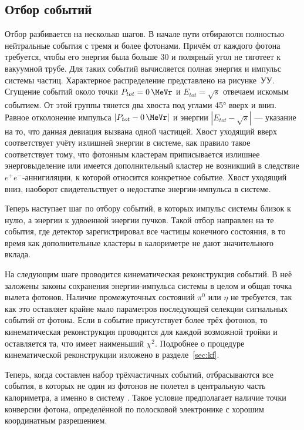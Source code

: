 \subsection{Отбор событий}

Отбор разбивается на несколько шагов. В начале пути отбираются полностью нейтральные события с тремя и более фотонами.
Причём от каждого фотона требуется, чтобы его энергия была больше \SI{30}{\MeVr} и полярный угол не тяготеет к вакуумной трубе.
Для таких событий вычисляется полная энергия и импульс системы частиц.
Характерное распределение представлено на рисунке~УУ.
Сгущение событий около точки $P_{tot} = \SI{0}{\MeVr}$ и $E_{tot} = \sqrt{s}$ отвечаем искомым событием.
От этой группы тянется два хвоста под углами \ang{45} вверх и вниз.
Равное отколонение импульса $|P_{tot} - \SI{0}{\MeVr}|$ и энергии $|E_{tot} - \sqrt{s}|$
---
указание на то,
что данная девиация вызвана одной частицей.
Хвост уходящий вверх соответствует учёту излишней энергии в системе,
как правило такое соответствует тому, что фотонным кластерам приписывается излишнее энерговыделение или имеется дополнительный кластер не возникший в следствие $e^+e^-$-аннигиляции, к которой относится конкретное событие.
Хвост уходящий вниз, наоборот свидетельствует о недостатке энергии-импульса в системе.

Теперь наступает шаг по отбору событий, в которых импульс системы близок к нулю, а энергии к удвоенной энергии пучков.
Такой отбор направлен на те события,
где детектор зарегистрировал все частицы конечного состояния,
в то время как дополнительные кластеры в калориметре не дают значительного вклада.

На следующим шаге проводится кинематическая реконструкция событий.
В неё заложены законы сохранения энергии-импульса системы в целом и общая точка вылета фотонов.
Наличие промежуточных состояний $\pi^0$ или $\eta$ не требуется, так как это оставляет крайне мало параметров последующей селекции сигнальных событий от фотона.
Если в событие присутствует более трёх фотонов, то кинематическая реконструкция проводится для каждой возможной тройки и оставляется та,
что имеет наименьший $\chi^2$.
Подробнее о процедуре кинематической реконструкции изложено в разделе~\ref{sec:kf}.

Теперь, 
когда составлен набор трёхчастичных событий, 
отбрасываются все события, 
в которых не один из фотонов не полетел в центральную часть калориметра, 
а именно в систему . 
Такое условие предполагает наличие точки конверсии фотона,
определённой по полосковой электронике  с хорошим координатным разрешением.

